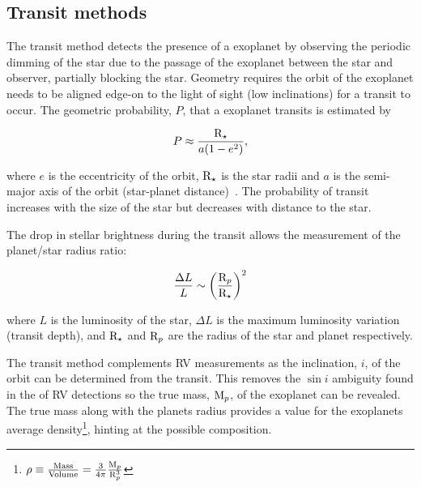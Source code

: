 \subsection{Transit methods}
\label{sub:transit}
The transit method detects the presence of a exoplanet by observing the periodic dimming of the star due to the passage of the exoplanet between the star and observer, partially blocking the star.
Geometry requires the orbit of the exoplanet needs to be aligned edge-on to the light of sight (low inclinations) for a transit to occur.
The geometric probability, $P$, that a exoplanet transits is estimated by

\begin{equation}
P \approx \frac{\textrm{R}_{\star}}{a (1-{e}^{2})},
\end{equation}

where \(e\) is the eccentricity of the orbit, $\textrm{R}_{\star}$ is the star radii and \(a\) is the semi-major axis of the orbit (star-planet distance)~\citep{barnes_effects_2007}.
The probability of transit increases with the size of the star but decreases with distance to the star.

The drop in stellar brightness during the transit allows the measurement of the planet/star radius ratio:

\begin{equation}
    \frac{\Delta L}{L} \sim {\left(\frac{\textrm{R}_{p}}{\textrm{R}_{\star}}\right)}^{2}
\end{equation}

where \(L\) is the luminosity of the star, \(\Delta L\) is the maximum luminosity variation (transit depth), and \(\textrm{R}_{\star}\) and \(\textrm{R}_{p}\) are the radius of the star and planet respectively.

The transit method complements {RV} measurements as the inclination, $i$, of the orbit can be determined from the transit.
This removes the {$\sin{i}$} ambiguity found in the \Mpsini{} of {RV} detections so the true mass, $\textrm{M}_{p}$, of the exoplanet can be revealed.
The true mass along with the planets radius provides a value for the exoplanets average density\footnote{$\rho \equiv \frac{ \textrm{Mass}}{\textrm{Volume}} = \frac{3}{4\pi}\frac{\textrm{M}_{p}}{\textrm{R}_{p}^{3}}$}, hinting at the possible composition.

